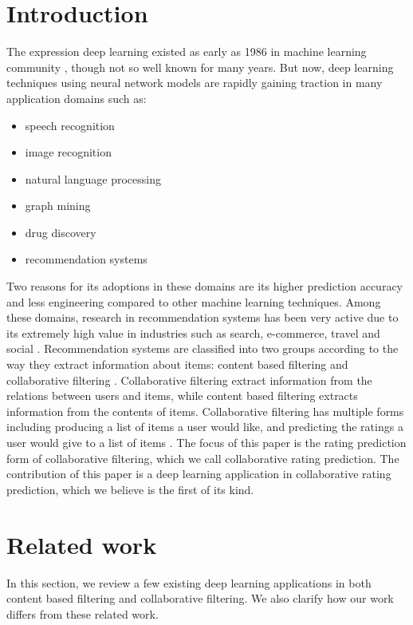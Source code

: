 \documentclass[twocolumn]{article}
\begin{document}
\section{Introduction}
The expression deep learning existed as early as 1986 in machine learning 
community \cite{dechter1986learning}, though not so well known for many years.
But now, deep learning techniques using neural network models are rapidly 
gaining traction in many application domains 
such as:
\begin{itemize}
	\item speech recognition \cite{hannun2014deep}
	\item image recognition \cite{simonyan2014very}
	\item natural language processing \cite{yao2013recurrent}
	\item graph mining \cite{grovernode2vec}
	\item drug discovery \cite{dahl2014multi}
	\item recommendation systems \cite{barkan2016item2vec}
\end{itemize}
Two reasons for its adoptions in these domains are its higher prediction 
accuracy and less engineering compared to other machine learning techniques.
Among these domains, research in recommendation systems has been very active  
due to its extremely high value in industries such as search, e-commerce, 
travel and social \cite{buettner2016predicting}.
Recommendation systems are classified into two groups according to the way they 
extract information about items: content based filtering and collaborative 
filtering \cite{ricci2011introduction}.
Collaborative filtering extract information from the relations between users 
and items, while content based filtering extracts information from the contents 
of items.
Collaborative filtering has multiple forms including producing a list of items 
a user would like, and predicting the ratings a user would give to a list of 
items \cite{su2009survey}.
The focus of this paper is the rating prediction form of collaborative 
filtering, which we call collaborative rating prediction.
The contribution of this paper is a deep learning application in 
collaborative rating prediction, which we believe is the first of its kind.

\section{Related work}
In this section,
we review a few existing deep learning applications in both content based 
filtering and collaborative filtering.
We also clarify how our work differs from these related work.
\end{document}
